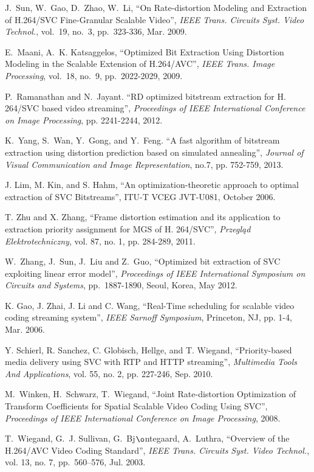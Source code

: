 \documentclass[journal,draftclsnofoot,onecolumn]{IEEEtran}
\begin{document}
\begin{thebibliography}{1}
J.~Sun, W.~Gao, D.~Zhao, W.~Li, ``On Rate-distortion Modeling and Extraction of H.264/SVC Fine-Granular Scalable Video'', {\em IEEE Trans. Circuits Syst. Video Technol.}, vol.~19, no.~3, pp.~323-336, Mar. 2009.

E.~Maani, A.~K. Katsaggelos, ``Optimized Bit Extraction Using Distortion Modeling in the Scalable Extension of H.264/AVC'', {\em IEEE Trans. Image Processing}, vol.~18, no.~9, pp.~2022-2029, 2009.

P.~Ramanathan and N.~Jayant. ``RD optimized bitstream extraction for H. 264/SVC based video streaming'', {\em Proceedings of IEEE International Conference on Image Processing}, pp. 2241-2244, 2012.

K.~Yang, S.~Wan, Y.~Gong, and Y.~Feng. ``A fast algorithm of bitstream extraction using distortion prediction based on simulated annealing'', {\em Journal of Visual Communication and Image Representation}, no.7, pp. 752-759, 2013.

J. Lim, M. Kin, and S. Hahm, ``An optimization-theoretic approach to optimal extraction of SVC Bitstreams'', ITU-T VCEG
JVT-U081, October 2006.

T. Zhu and X. Zhang, ``Frame distortion estimation and its application to extraction priority assignment for MGS of H. 264/SVC'', {\em Przegląd Elektrotechniczny}, vol. 87, no. 1, pp. 284-289, 2011.

W.~Zhang, J.~Sun, J.~Liu and Z.~Guo, ``Optimized bit extraction of SVC exploiting linear error model'', {\em Proceedings of IEEE International Symposium on Circuits and Systems}, pp.~1887-1890, Seoul, Korea, May 2012.

K. Gao, J. Zhai, J. Li and C. Wang, ``Real-Time scheduling for scalable video coding streaming system'', {\em IEEE Sarnoff Symposium}, Princeton, NJ, pp. 1-4, Mar. 2006.

Y. Schierl, R. Sanchez, C. Globisch, Hellge, and T. Wiegand, ``Priority-based media delivery using SVC with RTP and HTTP streaming'', {\em Multimedia Tools And Applications}, vol. 55, no. 2, pp. 227-246, Sep. 2010.

M.~Winken, H.~Schwarz, T.~Wiegand, ``Joint Rate-distortion Optimization of Transform Coefficients for Spatial Scalable Video Coding Using SVC'', {\em Proceedings of IEEE International Conference on Image Processing}, 2008.

T.~Wiegand, G.~J. Sullivan, G.~Bj$\o$ntegaard, A.~Luthra, ``Overview of the H.264/AVC Video Coding Standard'', {\em IEEE Trans. Circuits Syst. Video Technol.}, vol. 13, no. 7, pp.~560--576, Jul. 2003.


\end{thebibliography}
\end{document}
